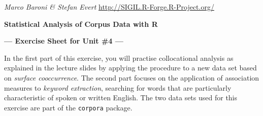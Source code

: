 \documentclass[a4paper,12pt]{article}
\begin{document}
\emph{Marco Baroni \& Stefan Evert} \hfill %
{\small \url{http://SIGIL.R-Forge.R-Project.org/}}

\begin{center}
  \textbf{\large Statistical Analysis of Corpus Data with R}

  \textbf{\large --- Exercise Sheet for Unit \#4 ---}
\end{center}

In the first part of this exercise, you will practise collocational analysis
as explained in the lecture slides by applying the procedure to a new data set
based on \emph{surface cooccurrence}.  The second part focuses on the
application of association measures to \emph{keyword extraction}, searching
for words that are particularly characteristic of spoken or written English.
The two data sets used for this exercise are part of the \texttt{corpora}
package.
\end{document}
